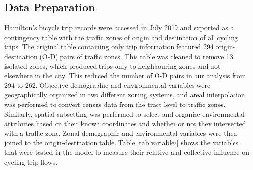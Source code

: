 \documentclass[smallextended]{svjour3}       %
\begin{document}
\hypertarget{data-preparation}{%
\subsection{Data Preparation}\label{data-preparation}}

Hamilton's bicycle trip records were accessed in July 2019 and exported
as a contingency table with the traffic zones of origin and destination
of all cycling trips. The original table containing only trip
information featured 294 origin-destination (O-D) pairs of traffic
zones. This table was cleaned to remove 13 isolated zones, which
produced trips only to neighbouring zones and not elsewhere in the city.
This reduced the number of O-D pairs in our analysis from 294 to 262.
Objective demographic and environmental variables were geographically
organized in two different zoning systems, and areal interpolation was
performed to convert census data from the tract level to traffic zones.
Similarly, spatial subsetting was performed to select and organize
environmental attributes based on their known coordinates and whether or
not they intersected with a traffic zone. Zonal demographic and
environmental variables were then joined to the origin-destination
table. Table \ref{tab:variables} shows the variables that were tested in
the model to measure their relative and collective influence on cycling
trip flows.
\end{document}
